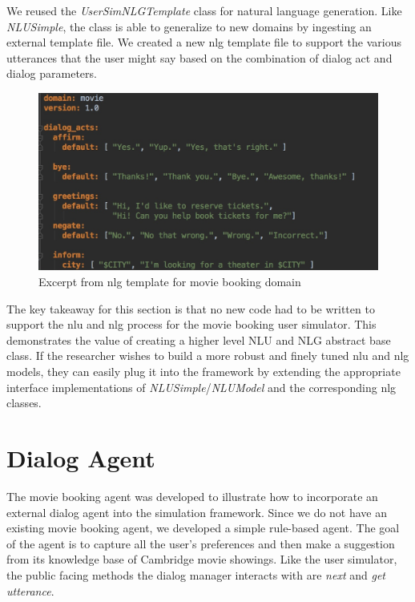 We reused the \textit{UserSimNLGTemplate} class for natural language generation. Like \textit{NLUSimple}, the class is able to generalize to new domains by ingesting an external template file. We created a new nlg template file to support the various utterances that the user might say based on the combination of dialog act and dialog parameters. 

\begin{figure}[h!]
	\centering
	\includegraphics[scale=.25]{diagrams/movie_nlg_template.jpeg}
	\caption{Excerpt from nlg template for movie booking domain }
	\label{fig:movie_nlg}
\end{figure}

The key takeaway for this section is that no new code had to be written to support the nlu and nlg process for the movie booking user simulator. This demonstrates the value of creating a higher level NLU and NLG abstract base class. If the researcher wishes to build a more robust and finely tuned nlu and nlg models, they can easily plug it into the framework by extending the appropriate interface implementations of \textit{NLUSimple}/\textit{NLUModel} and the corresponding nlg classes. 

\section{Dialog Agent}

The movie booking agent was developed to illustrate how to incorporate an external dialog agent into the simulation framework. Since we do not have an existing movie booking agent, we developed a simple rule-based agent. The goal of the agent is to capture all the user's preferences and then make a suggestion from its knowledge base of Cambridge movie showings. Like the user simulator, the public facing methods the dialog manager interacts with are \textit{next} and \textit{get utterance}. 


